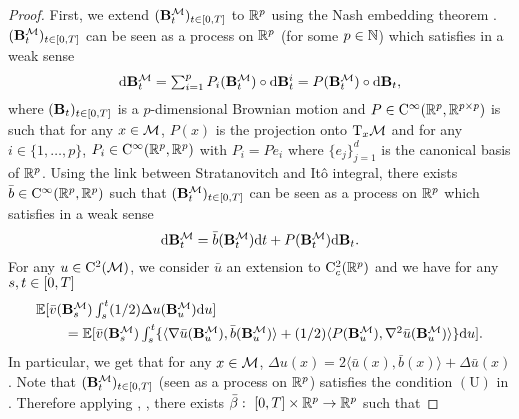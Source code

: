   \begin{proof}
    First, we extend $(\mathbf{B}_t^\mathcal M)_{t \in \left[0,T\right]}$ to $\mathbb{R}^p$ using the
    Nash embedding theorem \citep[see][]{gunther1991isometric}.
    $(\mathbf{B}_t^\mathcal M)_{t \in \left[0,T\right]}$ can be seen as a process on $\mathbb{R}^p$ (for
    some $p \in \mathbb{N}$) which satisfies in a weak sense
    \begin{equation}
      \textstyle{
        \mathrm{d}\mathbf{B}_t^\mathcal M= \sum_{i=1}^p P_i(\mathbf{B}_t^\mathcal M) \circ \mathrm{d}\mathbf{B}_t^i  = P(\mathbf{B}_t^\mathcal M) \circ \mathrm{d}\mathbf{B}_t  ,
        }
    \end{equation}
    where $(\mathbf{B}_t)_{t \in \left[0,T\right]}$ is a $p$-dimensional Brownian motion
    and $P \in \mathrm{C}^\infty(\mathbb{R}^p, \mathbb{R}^{p\times p})$ is such that for any
    $x \in \mathcal M$, $P(x)$ is the projection onto $\mathrm{T}_x \mathcal M$ and for any
    $i \in \{1, \dots, p\}$, $P_i \in \mathrm{C}^\infty(\mathbb{R}^p, \mathbb{R}^p)$ with
    $P_i = P e_i$ where $\{e_j\}_{j=1}^d$ is the canonical basis of $\mathbb{R}^p$.
    Using the link between Stratanovitch and It\^o integral, there exists
    $\bar{b} \in \mathrm{C}^\infty(\mathbb{R}^p, \mathbb{R}^p)$ such that
    $(\mathbf{B}_t^\mathcal M)_{t \in \left[0,T\right]}$ can be seen as a process on $\mathbb{R}^p$
    which satisfies in a weak sense
    \begin{equation}
      \textstyle{
        \mathrm{d}\mathbf{B}_t^\mathcal M= \bar{b}(\mathbf{B}_t^\mathcal M) \mathrm{d}t +  P(\mathbf{B}_t^\mathcal M)  \mathrm{d}\mathbf{B}_t  .
        }
      \end{equation}
      For any $u \in \mathrm{C}^2(\mathcal M)$, we consider $\bar{u}$ an extension to $\mathrm{C}^2_c(\mathbb{R}^p)$ and we have for any $s, t \in \left[0,T\right]$
      \begin{align}
        &\textstyle{\mathbb{E}[ \bar{v}(\mathbf{B}_s^\mathcal M) \int_s^t (1/2) \Delta u(\mathbf{B}_u^\mathcal M) \mathrm{d}u ]} \\
        & \qquad =  \textstyle{\mathbb{E}[ \bar{v}(\mathbf{B}_s^\mathcal M) \int_s^t \{ \langle \nabla \bar{u}(\mathbf{B}_u^\mathcal M), \bar{b}(\mathbf{B}_u^\mathcal M) \rangle + (1/2) \langle P(\mathbf{B}_u^\mathcal M), \nabla^2 \bar{u}(\mathbf{B}_u^\mathcal M) \rangle \} \mathrm{d}u ]  . }
      \end{align}
      In particular, we get that for any $x \in \mathcal M$,
      $\Delta u(x) = 2 \langle \bar{u}(x), \bar{b}(x) \rangle + \Delta
      \bar{u}(x)$ . Note
      that $(\mathbf{B}_t^\mathcal M)_{t \in \left[0,T\right]}$ (seen as a process on $\mathbb{R}^p$)
      satisfies the condition $\mathrm{(U)}$ in
      \cite{leonard2012girsanov}. Therefore applying \cite[Theorem
      2.1]{leonard2012girsanov}, \citep[Claim 4.5]{cattiaux2021time}, there
      exists $\bar{\beta}: \ \left[0,T\right] \times \mathbb{R}^p \to \mathbb{R}^p$ such that

\end{proof}
